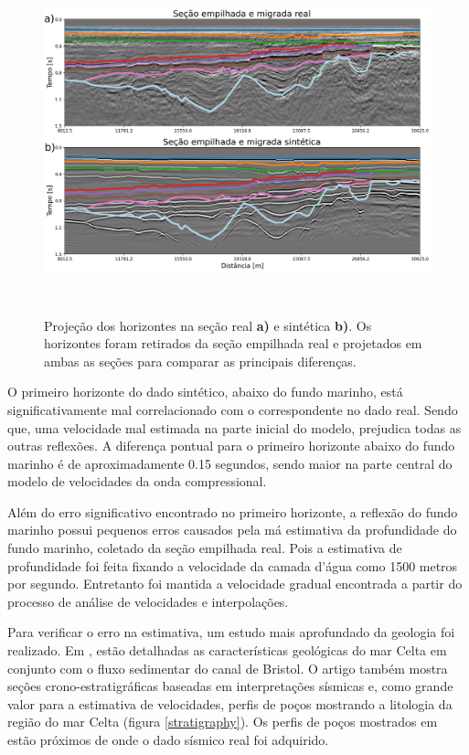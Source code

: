 \documentclass[
	12pt,				%
	openright,			%
	oneside,			%
	a4paper,			%
	english,			%
	brazil				%
	]{abntex2}
\begin{document}
	\begin{figure}[htp!]
		\centering
		\includegraphics[width=16cm,height=10cm]{../imagens/comparisionHRZ.png}
		\caption{Projeção dos horizontes na seção real \textbf{a)} e sintética \textbf{b)}. Os horizontes foram retirados da seção empilhada real e projetados em ambas as seções para comparar as principais diferenças.}
		\label{comparisionHrz}
	\end{figure}

	\newpage
	O primeiro horizonte do dado sintético, abaixo do fundo marinho, está significativamente mal correlacionado com o correspondente no dado real. Sendo que, uma velocidade mal estimada na parte inicial do modelo, prejudica todas as outras reflexões. A diferença pontual para o primeiro horizonte abaixo do fundo marinho é de aproximadamente 0.15 segundos, sendo maior na parte central do modelo de velocidades da onda compressional. 
	
	Além do erro significativo encontrado no primeiro horizonte, a reflexão do fundo marinho possui pequenos erros causados pela má estimativa da profundidade do fundo marinho, coletado da seção empilhada real. Pois a estimativa de profundidade foi feita fixando a velocidade da camada d'água como 1500 metros por segundo. Entretanto foi mantida a velocidade gradual encontrada a partir do processo de análise de velocidades e interpolações.
	
	Para verificar o erro na estimativa, um estudo mais aprofundado da geologia foi realizado. Em , estão detalhadas as características geológicas do mar Celta em conjunto com o fluxo sedimentar do canal de Bristol. O artigo também mostra seções crono-estratigráficas baseadas em interpretações sísmicas e, como grande valor para a estimativa de velocidades, perfis de poços mostrando a litologia da região do mar Celta (figura \ref{stratigraphy}). Os perfis de poços mostrados em  estão próximos de onde o dado sísmico real foi adquirido.       
\end{document}

